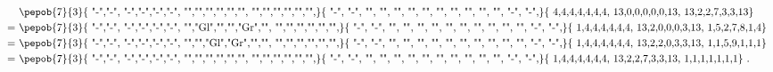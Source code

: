 \begin{equation}
    \begin{split}
        & \vcenter{ \hbox{ \pepob{7}{3}{{
                            "-","-", "-","-","-","-",
                            "","","","","","",
                            "","","","","","",}}{{
                            "-", "-",
                            "", "",
                            "", "",
                            "", "",
                            "", "",
                            "", "",
                            "-", "-",}}{{
                            4,4,4,4,4,4,4,
                            13,0,0,0,0,0,13,
                            13,2,2,7,3,3,13}} }}\\
        =&       \vcenter{ \hbox{ \pepob{7}{3}{{
                            "-","-", "-","-","-","-",
                            "","Gl","","","Gr","",
                            "","","","","","",}}{{
                            "-", "-",
                            "", "",
                            "", "",
                            "", "",
                            "", "",
                            "", "",
                            "-", "-",}}{{
                            1,4,4,4,4,4,4,
                            13,2,0,0,0,3,13,
                            1,5,2,7,8,1,4}}}} \\
        =&  \vcenter{ \hbox{ \pepob{7}{3}{{
                            "-","-", "-","-","-","-",
                            "","","Gl","Gr","","",
                            "","","","","","",}}{{
                            "-", "-",
                            "", "",
                            "", "",
                            "", "",
                            "", "",
                            "", "",
                            "-", "-",}}{{
                            1,4,4,4,4,4,4,
                            13,2,2,0,3,3,13,
                            1,1,5,9,1,1,1}} }}\\
        =& \vcenter{ \hbox{ \pepob{7}{3}{{
                            "-","-", "-","-","-","-",
                            "","","","","","",
                            "","","","","","",}}{{
                            "-", "-",
                            "", "",
                            "", "",
                            "", "",
                            "", "",
                            "", "",
                            "-", "-",}}{{
                            1,4,4,4,4,4,4,
                            13,2,2,7,3,3,13,
                            1,1,1,1,1,1,1}} }}.
    \end{split}
\end{equation}
